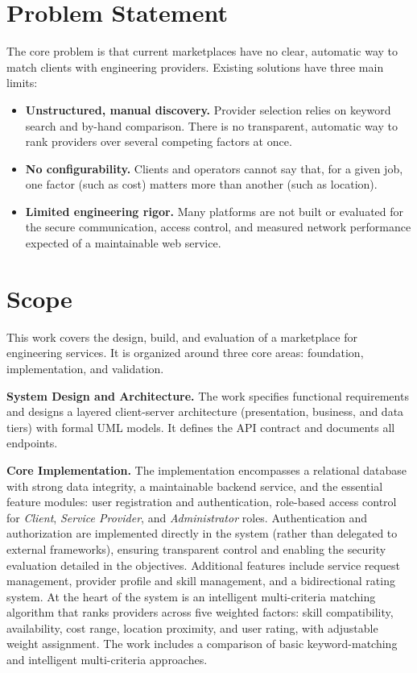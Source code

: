 \section{Problem Statement}
The core problem is that current marketplaces have no clear, automatic way to
match clients with engineering providers. Existing solutions have three main
limits:

\begin{itemize}
	\item \textbf{Unstructured, manual discovery.} Provider selection relies on
	      keyword search and by-hand comparison. There is no transparent,
	      automatic way to rank providers over several competing factors at once.
	\item \textbf{No configurability.} Clients and operators cannot say that, for
	      a given job, one factor (such as cost) matters more than another (such
	      as location).
	\item \textbf{Limited engineering rigor.} Many platforms are not built or
	      evaluated for the secure communication, access control, and measured
	      network performance expected of a maintainable web service.
\end{itemize}

\section{Scope}
This work covers the design, build, and evaluation of a marketplace for
engineering services. It is organized around three core areas: foundation,
implementation, and validation.

\textbf{System Design and Architecture.} The work specifies functional
requirements and designs a layered client-server architecture (presentation,
business, and data tiers) with formal UML models. It defines the API contract
and documents all endpoints.

\textbf{Core Implementation.} The implementation encompasses a relational
database with strong data integrity, a maintainable backend service, and the
essential feature modules: user registration and authentication, role-based
access control for \textit{Client}, \textit{Service Provider}, and
\textit{Administrator} roles. Authentication and authorization are implemented
directly in the system (rather than delegated to external frameworks), ensuring
transparent control and enabling the security evaluation detailed in the
objectives. Additional features include service request management, provider
profile and skill management, and a bidirectional rating system. At the heart of
the system is an intelligent multi-criteria matching algorithm that ranks
providers across five weighted factors: skill compatibility, availability, cost
range, location proximity, and user rating, with adjustable weight assignment.
The work includes a comparison of basic keyword-matching and intelligent
multi-criteria approaches.

